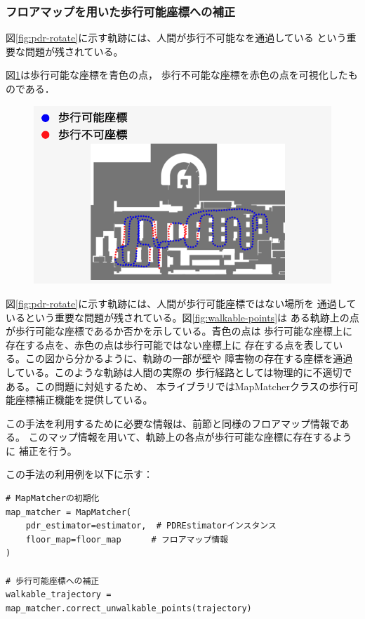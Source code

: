 
\subsubsection{フロアマップを用いた歩行可能座標への補正}

図\ref{fig:pdr-rotate}に示す軌跡には、人間が歩行不可能なを通過している
という重要な問題が残されている。

図\ref{fig:unwalkable_points}は歩行可能な座標を青色の点，
歩行不可能な座標を赤色の点を可視化したものである．
\begin{figure}[H]
    \centering
    \includegraphics[width=\linewidth]{image/unwalkable_points.jpg}
    \caption{}    \label{fig:unwalkable_points}
\end{figure}


図\ref{fig:pdr-rotate}に示す軌跡には、人間が歩行可能座標ではない場所を
通過しているという重要な問題が残されている。図\ref{fig:walkable-points}は
ある軌跡上の点が歩行可能な座標であるか否かを示している。青色の点は
歩行可能な座標上に存在する点を、赤色の点は歩行可能ではない座標上に
存在する点を表している。この図から分かるように、軌跡の一部が壁や
障害物の存在する座標を通過している。このような軌跡は人間の実際の
歩行経路としては物理的に不適切である。この問題に対処するため、
本ライブラリではMapMatcherクラスの歩行可能座標補正機能を提供している。


この手法を利用するために必要な情報は、前節と同様のフロアマップ情報である。
このマップ情報を用いて、軌跡上の各点が歩行可能な座標に存在するように
補正を行う。

この手法の利用例を以下に示す：

\begin{lstlisting}
# MapMatcherの初期化
map_matcher = MapMatcher(
    pdr_estimator=estimator,  # PDREstimatorインスタンス
    floor_map=floor_map      # フロアマップ情報
)

# 歩行可能座標への補正
walkable_trajectory = map_matcher.correct_unwalkable_points(trajectory)
\end{lstlisting}

